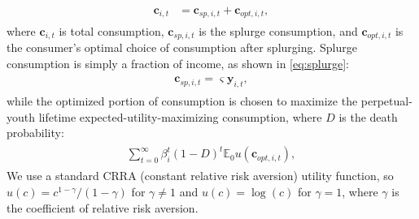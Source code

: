 \documentclass[qe,draft]{econsocart}
\theoremstyle{plain}
\theoremstyle{definition}
\begin{document}
\begin{equation}
    \begin{gathered}
      \begin{aligned}
        \mathbf{c}_{i,t} & = \mathbf{c}_{sp,i,t} + \mathbf{c}_{opt,i,t}, \label{eq:model} %
      \end{aligned}
    \end{gathered}
  \end{equation}
{\noindent}where $\mathbf{c}_{i,t}$ is total consumption, $\mathbf{c}_{sp,i,t}$ is the splurge consumption, and $\mathbf{c}_{opt,i,t}$ is the consumer's optimal choice of consumption after splurging.
Splurge consumption is simply a fraction of income, as shown in \eqref{eq:splurge}:
\begin{equation}
  \begin{gathered}
    \begin{aligned}
      \mathbf{c}_{sp,i,t} = \varsigma \mathbf{y}_{i,t},
      \label{eq:splurge} %
    \end{aligned}
  \end{gathered}
\end{equation}
while the optimized portion of consumption is chosen to maximize the perpetual-youth lifetime expected-utility-maximizing consumption, where $D$ is the death probability:
\begin{equation}
  \begin{gathered}
    \begin{aligned}
      \sum_{t=0}^{\infty}\beta_i^t {(1-D)}^t \mathbb{E}_0 u(\mathbf{c}_{opt,i,t}),
      \label{eq:utility} %
    \end{aligned}
  \end{gathered}
\end{equation}
We use a standard CRRA (constant relative risk aversion) utility function, so $u(c) = c^{1-\gamma}/(1-\gamma)$ for $\gamma \neq 1$ and $u(c) = \log(c)$ for $\gamma=1$, where $\gamma$ is the coefficient of relative risk aversion.
\end{document}
